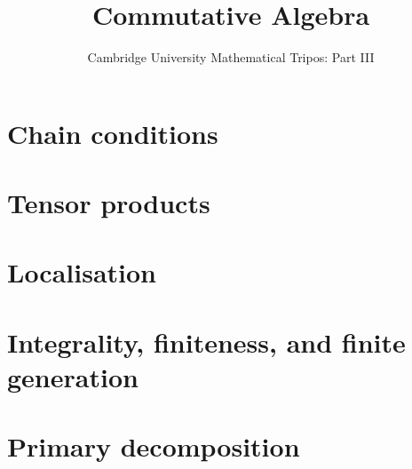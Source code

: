 \documentclass{article}
\title{Commutative Algebra}
\author{Cambridge University Mathematical Tripos: Part III}
\begin{document}
\maketitle

\tableofcontentsnewpage{}

\section{Chain conditions}

\section{Tensor products}

\section{Localisation}

\section{Integrality, finiteness, and finite generation}

\section{Primary decomposition}

\end{document}
